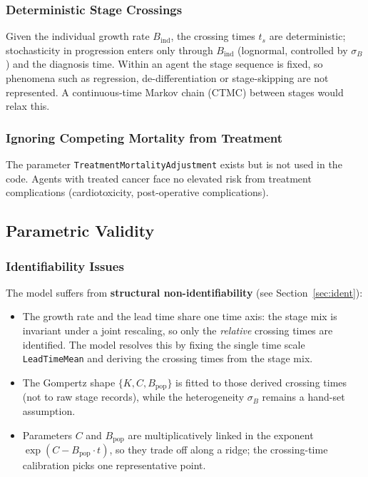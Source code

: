 \documentclass[12pt,a4paper]{article}
\begin{document}
\subsubsection{Deterministic Stage Crossings}
Given the individual growth rate $B_{\text{ind}}$, the crossing times $t_s$ are deterministic; stochasticity in progression enters only through $B_{\text{ind}}$ (lognormal, controlled by $\sigma_B$) and the diagnosis time. Within an agent the stage sequence is fixed, so phenomena such as regression, de-differentiation or stage-skipping are not represented. A continuous-time Markov chain (CTMC) between stages would relax this.

\subsubsection{Ignoring Competing Mortality from Treatment}
The parameter \texttt{TreatmentMortalityAdjustment} exists but is not used in the code. Agents with treated cancer face no elevated risk from treatment complications (cardiotoxicity, post-operative complications).

\subsection{Parametric Validity}

\subsubsection{Identifiability Issues}
The model suffers from \textbf{structural non-identifiability} (see Section~\ref{sec:ident}):
\begin{itemize}[nosep]
    \item The growth rate and the lead time share one time axis: the stage mix is invariant under a joint rescaling, so only the \emph{relative} crossing times are identified. The model resolves this by fixing the single time scale \texttt{LeadTimeMean} and deriving the crossing times from the stage mix.
    \item The Gompertz shape $\{K, C, B_{\text{pop}}\}$ is fitted to those derived crossing times (not to raw stage records), while the heterogeneity $\sigma_B$ remains a hand-set assumption.
    \item Parameters $C$ and $B_{\text{pop}}$ are multiplicatively linked in the exponent $\exp(C - B_{\text{pop}} \cdot t)$, so they trade off along a ridge; the crossing-time calibration picks one representative point.
\end{itemize}
\end{document}
